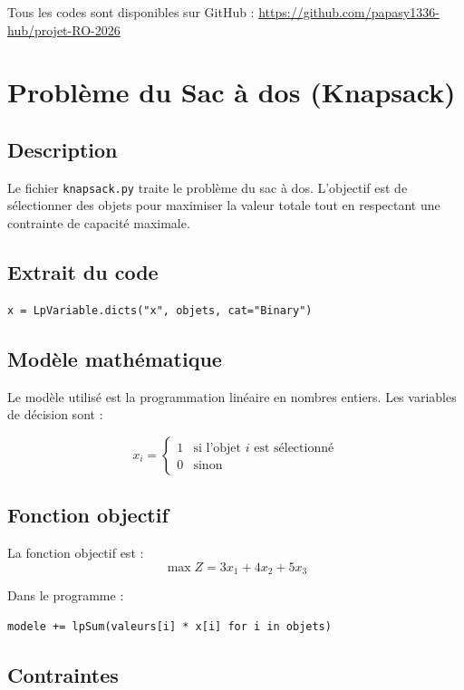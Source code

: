 \documentclass[12pt,a4paper]{article}
\begin{document}
Tous les codes sont disponibles sur GitHub :
\url{https://github.com/papasy1336-hub/projet-RO-2026}

\section{Problème du Sac à dos (Knapsack)}

\subsection{Description}
Le fichier \texttt{knapsack.py} traite le problème du sac à dos.
L'objectif est de sélectionner des objets pour maximiser la valeur
totale tout en respectant une contrainte de capacité maximale.

\subsection{Extrait du code}

\begin{lstlisting}
x = LpVariable.dicts("x", objets, cat="Binary")
\end{lstlisting}

\subsection{Modèle mathématique}

Le modèle utilisé est la programmation linéaire en nombres entiers.
Les variables de décision sont :

\[
x_i = \begin{cases} 1 & \text{si l'objet } i \text{ est sélectionné} \\ 0 & \text{sinon} \end{cases}
\]

\subsection{Fonction objectif}

La fonction objectif est :
\[
\max Z = 3x_1 + 4x_2 + 5x_3
\]

Dans le programme :
\begin{lstlisting}
modele += lpSum(valeurs[i] * x[i] for i in objets)
\end{lstlisting}

\subsection{Contraintes}
\end{document}
